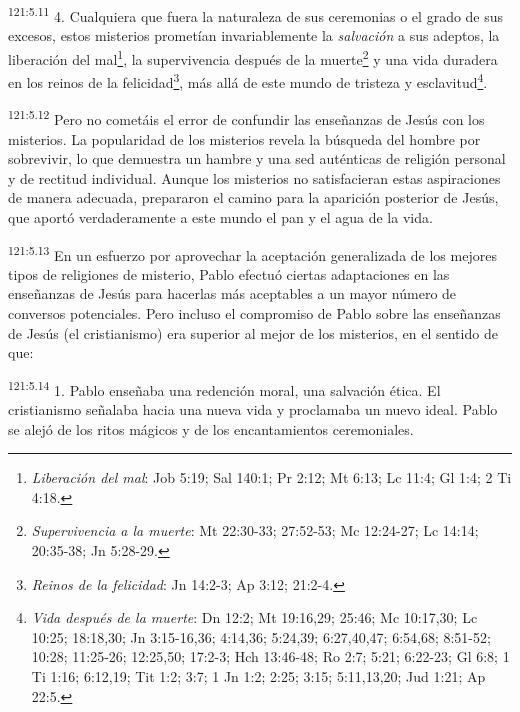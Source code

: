 \par 
\textsuperscript{121:5.11} 4. Cualquiera que fuera la naturaleza de sus ceremonias o el grado de sus excesos, estos misterios prometían invariablemente la \textit{salvación} a sus adeptos, \guillemotleft la liberación del mal\footnote{\textit{Liberación del mal}: Job 5:19; Sal 140:1; Pr 2:12; Mt 6:13; Lc 11:4; Gl 1:4; 2 Ti 4:18.}, la supervivencia después de la muerte\footnote{\textit{Supervivencia a la muerte}: Mt 22:30-33; 27:52-53; Mc 12:24-27; Lc 14:14; 20:35-38; Jn 5:28-29.} y una vida duradera en los reinos de la felicidad\footnote{\textit{Reinos de la felicidad}: Jn 14:2-3; Ap 3:12; 21:2-4.}, más allá de este mundo de tristeza y esclavitud\footnote{\textit{Vida después de la muerte}: Dn 12:2; Mt 19:16,29; 25:46; Mc 10:17,30; Lc 10:25; 18:18,30; Jn 3:15-16,36; 4:14,36; 5:24,39; 6:27,40,47; 6:54,68; 8:51-52; 10:28; 11:25-26; 12:25,50; 17:2-3; Hch 13:46-48; Ro 2:7; 5:21; 6:22-23; Gl 6:8; 1 Ti 1:16; 6:12,19; Tit 1:2; 3:7; 1 Jn 1:2; 2:25; 3:15; 5:11,13,20; Jud 1:21; Ap 22:5.}\guillemotright.

\par 
\textsuperscript{121:5.12} Pero no cometáis el error de confundir las enseñanzas de Jesús con los misterios. La popularidad de los misterios revela la búsqueda del hombre por sobrevivir, lo que demuestra un hambre y una sed auténticas de religión personal y de rectitud individual. Aunque los misterios no satisfacieran estas aspiraciones de manera adecuada, prepararon el camino para la aparición posterior de Jesús, que aportó verdaderamente a este mundo el pan y el agua de la vida.

\par 
\textsuperscript{121:5.13} En un esfuerzo por aprovechar la aceptación generalizada de los mejores tipos de religiones de misterio, Pablo efectuó ciertas adaptaciones en las enseñanzas de Jesús para hacerlas más aceptables a un mayor número de conversos potenciales. Pero incluso el compromiso de Pablo sobre las enseñanzas de Jesús (el cristianismo) era superior al mejor de los misterios, en el sentido de que:

\par 
\textsuperscript{121:5.14} 1. Pablo enseñaba una redención moral, una salvación ética. El cristianismo señalaba hacia una nueva vida y proclamaba un nuevo ideal. Pablo se alejó de los ritos mágicos y de los encantamientos ceremoniales.

